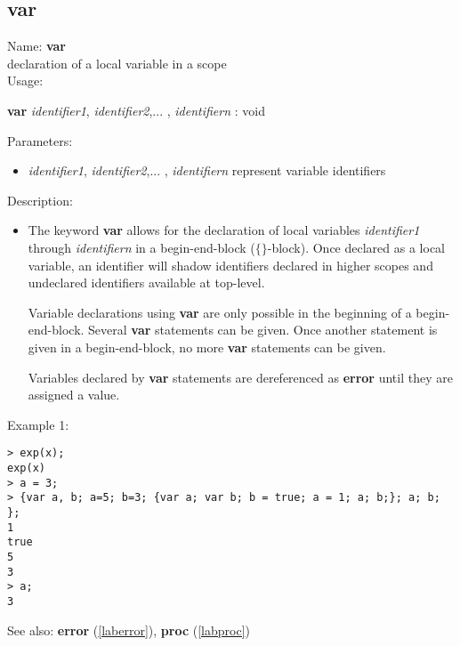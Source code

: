 \subsection{var}
\label{labvar}
\noindent Name: \textbf{var}\\
\phantom{aaa}declaration of a local variable in a scope\\[0.2cm]
\noindent Usage: 
\begin{center}
\textbf{var} \emph{identifier1}, \emph{identifier2},... , \emph{identifiern} : \textsf{void}\\
\end{center}
Parameters: 
\begin{itemize}
\item \emph{identifier1}, \emph{identifier2},... , \emph{identifiern} represent variable identifiers
\end{itemize}
\noindent Description: \begin{itemize}

\item The keyword \textbf{var} allows for the declaration of local variables
   \emph{identifier1} through \emph{identifiern} in a begin-end-block ($\lbrace \rbrace$-block).
   Once declared as a local variable, an identifier will shadow
   identifiers declared in higher scopes and undeclared identifiers
   available at top-level.
    
   Variable declarations using \textbf{var} are only possible in the
   beginning of a begin-end-block. Several \textbf{var} statements can be
   given. Once another statement is given in a begin-end-block, no more
   \textbf{var} statements can be given.
    
   Variables declared by \textbf{var} statements are dereferenced as \textbf{error}
   until they are assigned a value. 
\end{itemize}
\noindent Example 1: 
\begin{center}\begin{minipage}{15cm}\begin{Verbatim}[frame=single]
> exp(x); 
exp(x)
> a = 3; 
> {var a, b; a=5; b=3; {var a; var b; b = true; a = 1; a; b;}; a; b; }; 
1
true
5
3
> a;
3
\end{Verbatim}
\end{minipage}\end{center}
See also: \textbf{error} (\ref{laberror}), \textbf{proc} (\ref{labproc})
